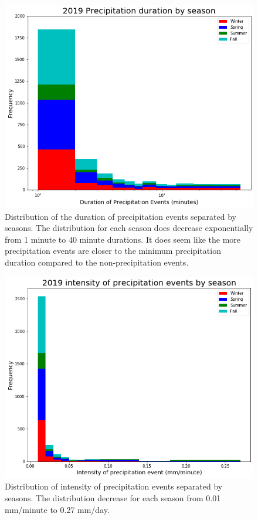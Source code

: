\begin{figure}[h]
	\centering
	\includegraphics[width=150mm]{../Figures/precip1mm_season_19.png}
	\caption{Distribution of the duration of precipitation events separated by seasons. The distribution for each season does decrease exponentially from 1 minute to 40 minute durations. It does seem like the more precipitation events are closer to the minimum precipitation duration compared to the non-precipitation events.}
\end{figure}
\begin{figure}[h]
	\centering
	\includegraphics[width=150mm]{../Figures/inten1mm_season_19.png}
	\caption{Distribution of intensity of precipitation events separated by seasons. The distribution decrease for each season from 0.01 mm/minute to 0.27 mm/day.  }
\end{figure}

